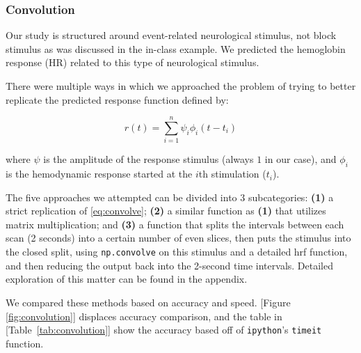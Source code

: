 \subsubsection{Convolution}
\par \indent Our study is structured around event-related neurological 
stimulus, not block stimulus as was discussed in the in-class example. We 
predicted the hemoglobin response (HR) related to this type of neurological 
stimulus. 

There were multiple ways in which we approached the problem of trying to 
better replicate the predicted response function defined by:

\begin{equation} \label{eq:convolve}
r(t)= \sum_{i=1}^n \psi_{i} \phi_{i}(t-t_i)
\end{equation}

where $\psi$ is the amplitude of the response stimulus (always $1$ in our 
case), and $\phi_{i}$ is the hemodynamic response started at the $i$th 
stimulation ($t_i$).

The five approaches we attempted can be divided into 3 subcategories: 
\textbf{(1)} a strict replication of \ref{eq:convolve}; \textbf{(2)} a similar 
function as \textbf{(1)} that utilizes matrix multiplication; and \textbf{(3)} a 
function that splits the intervals between each scan (2 seconds) into a certain 
number of even slices, then puts the stimulus into the closed split, using 
\texttt{np.convolve} on this stimulus and a detailed hrf function, and then 
reducing the output back into the 2-second time intervals. Detailed exploration 
of this matter can be found in the appendix.

We compared these methods based on accuracy and speed. [Figure 
\ref{fig:convolution}] displaces accuracy comparison, and the table in 
[Table~\ref{tab:convolution}] show the accuracy based off of \texttt{ipython}'s 
\texttt{timeit} function.



